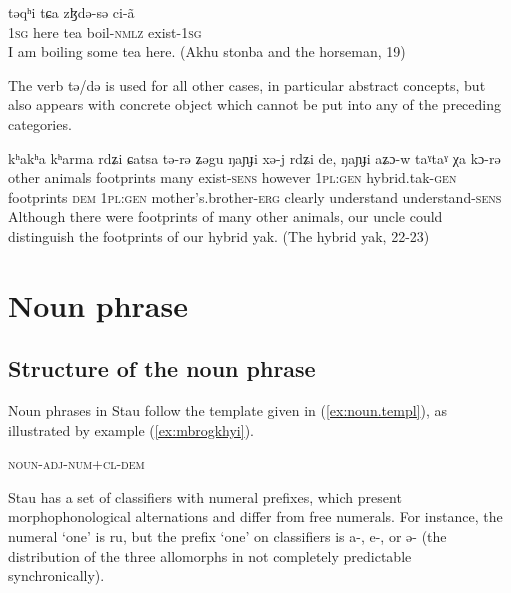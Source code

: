 \documentclass[oneside,a4paper,11pt]{article}
\newcommand{\ipa}[1]{{\phon#1}} %
\begin{document}
\begin{exe}
\ex \label{ex:tea}
\gll \ipa{ŋa} 	\ipa{təqʰi} 	\ipa{tɕa} 	\ipa{zɮdə-sə} 	\ipa{ci-ã} \\
\textsc{1sg} here tea boil-\textsc{nmlz} exist-\textsc{1sg} \\
\glt I am boiling some tea here. (Akhu stonba and the horseman, 19)
\end{exe}

The verb \ipa{tə/də} is used for all other cases, in particular abstract concepts, but also appears with concrete object which cannot be put into any of the preceding categories.

\begin{exe}
\ex \label{ex:kharma}
\gll
\ipa{kʰakʰa} 	\ipa{kʰarma} 	\ipa{rdʑi} 	\ipa{ɕatsa} 	\ipa{tə-rə} 	\ipa{ʑəgu} \ipa{ŋaɲɟi} 	\ipa{xə-j} 	\ipa{rdʑi} 	\ipa{de,} 	\ipa{ŋaɲɟi} 	\ipa{aʑɔ-w} 	\ipa{taˠtaˠ} 	\ipa{χa} 	\ipa{kɔ-rə} \\
other animals footprints many exist-\textsc{sens} however \textsc{1pl:gen} hybrid.tak-\textsc{gen} footprints \textsc{dem} \textsc{1pl:gen} mother's.brother-\textsc{erg} clearly understand understand-\textsc{sens} \\
\glt Although there were footprints of many other animals, our uncle could distinguish the footprints of our hybrid yak. (The hybrid yak, 22-23)
\end{exe}

 
 \section{Noun phrase}

\subsection{Structure of the noun phrase}
Noun phrases in Stau follow the template given in (\ref{ex:noun.templ}), as illustrated by example (\ref{ex:mbrogkhyi}). 

\begin{exe}
\ex \label{ex:noun.templ}
\glt \textsc{noun-adj-num+cl-dem}
\end{exe}

Stau has a set of classifiers with numeral prefixes, which present morphophonological alternations and differ from free numerals. For instance, the numeral `one' is \ipa{ru}, but the prefix `one' on classifiers is \ipa{a-}, \ipa{e-}, or \ipa{ə-} (the distribution of the three allomorphs in not completely predictable synchronically).
\end{document}
